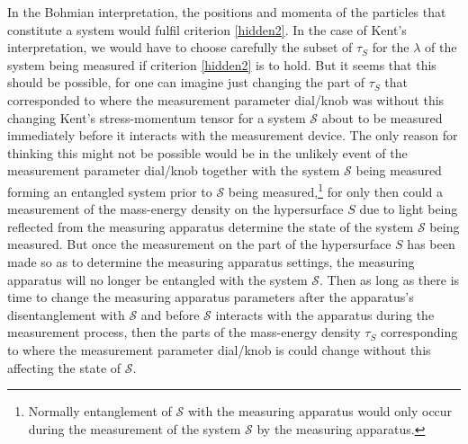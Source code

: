 \documentclass[12pt]{report}
\begin{document}
In the Bohmian interpretation, the positions and momenta of the particles that constitute a system would fulfil criterion \ref{hidden2}. In the case of Kent's interpretation, we would have to choose carefully the subset of $\tau_S$ for the $\lambda$ of the system being measured if criterion \ref{hidden2} is to hold. But it seems that this should be possible, for one can imagine just changing the part of $\tau_S$ that corresponded to where the measurement parameter dial/knob was without this changing Kent's stress-momentum tensor for a system $\mathcal{S}$ about to be measured immediately before it interacts with the measurement device. The only reason for thinking this might not be possible would be in the unlikely event of the measurement parameter dial/knob together with the system $\mathcal{S}$ being measured forming an entangled system prior to $\mathcal{S}$ being measured,\footnote{Normally entanglement of $\mathcal{S}$ with the measuring apparatus would only occur during the measurement of the system $\mathcal{S}$ by the measuring apparatus.} for only then could a measurement of the mass-energy density on the hypersurface $S$ due to light being reflected from the measuring apparatus determine the state of the system $\mathcal{S}$ being measured. But once the measurement on the part of the hypersurface $S$ has been made so as to determine the measuring apparatus settings, the measuring apparatus will no longer be entangled with the system $\mathcal{S}$. Then as long as there is time to change the measuring apparatus parameters after the apparatus's disentanglement with $\mathcal{S}$ and before $\mathcal{S}$ interacts with the apparatus during the measurement process, then the parts of the mass-energy density $\tau_S$   corresponding to where the measurement parameter dial/knob is could change without this affecting the state of $\mathcal{S}$.  
\end{document}
